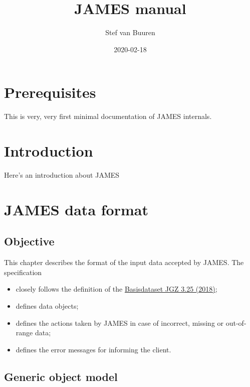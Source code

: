 \documentclass[]{book}
\title{JAMES manual}
\author{Stef van Buuren}
\date{2020-02-18}
\providecommand{\tightlist}{%
  \setlength{\itemsep}{0pt}\setlength{\parskip}{0pt}}
\begin{document}
\maketitle

{
\setcounter{tocdepth}{1}
\tableofcontents
}
\hypertarget{prerequisites}{%
\chapter{Prerequisites}\label{prerequisites}}

This is very, very first minimal documentation of JAMES internals.

\hypertarget{intro}{%
\chapter{Introduction}\label{intro}}

Here's an introduction about JAMES

\hypertarget{james-data-format}{%
\chapter{JAMES data format}\label{james-data-format}}

\hypertarget{objective}{%
\section{Objective}\label{objective}}

This chapter describes the format of the input data accepted by JAMES. The specification

\begin{itemize}
\tightlist
\item
  closely follows the definition of the \href{https://www.ncj.nl/themadossiers/informatisering/basisdataset/}{Basisdataset JGZ 3.25 (2018)};
\item
  defines data objects;
\item
  defines the actions taken by JAMES in case of incorrect, missing or out-of-range data;
\item
  defines the error messages for informing the client.
\end{itemize}

\hypertarget{generic-object-model}{%
\section{Generic object model}\label{generic-object-model}}
\end{document}
